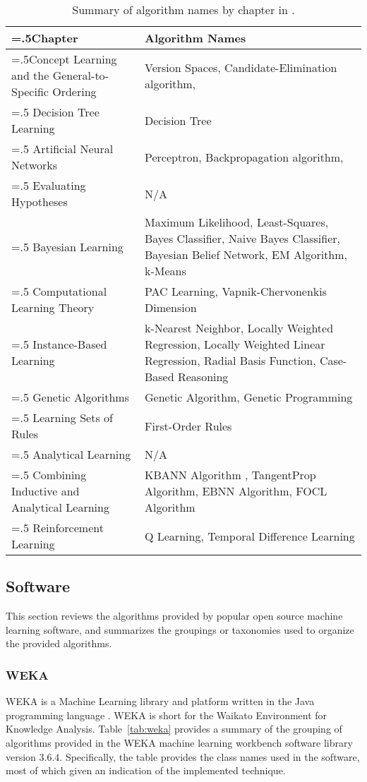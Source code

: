 \documentclass[a4paper, 11pt]{article}
\begin{document}
\begin{table}[ht]
	\centering\footnotesize
		\begin{tabularx}{\textwidth}{>{\hsize=.5\hsize}XX}
		\toprule
		\textbf{Chapter} & \textbf{Algorithm Names} \\ 
		\toprule
		Concept Learning and the General-to-Specific Ordering & Version Spaces, Candidate-Elimination algorithm, \\
		\midrule
		Decision Tree Learning & Decision Tree\\
		\midrule		
		Artificial Neural Networks & Perceptron, Backpropagation algorithm, \\
		\midrule		
		Evaluating Hypotheses & N/A \\
		\midrule		
		Bayesian Learning & Maximum Likelihood, Least-Squares, Bayes Classifier, Naive Bayes Classifier, Bayesian Belief Network, EM Algorithm, k-Means \\
		\midrule				
		Computational Learning Theory & PAC Learning, Vapnik-Chervonenkis Dimension \\
		\midrule		
		Instance-Based Learning & k-Nearest Neighbor, Locally Weighted Regression, Locally Weighted Linear Regression, Radial Basis Function, Case-Based Reasoning \\
		\midrule		
		Genetic Algorithms & Genetic Algorithm, Genetic Programming \\
		\midrule		
		Learning Sets of Rules & First-Order Rules \\
		\midrule		
		Analytical Learning & N/A \\
		\midrule		
		Combining Inductive and Analytical Learning & KBANN Algorithm , TangentProp Algorithm, EBNN Algorithm, FOCL Algorithm\\
		\midrule		
		Reinforcement Learning & Q Learning, Temporal Difference Learning\\
		\bottomrule
		\end{tabularx}	
	\caption{Summary of algorithm names by chapter in .}
	\label{tab:mlbook}
\end{table}


\subsection{Software}
This section reviews the algorithms provided by popular open source machine learning software, and summarizes the groupings or taxonomies used to organize the provided algorithms.

\subsubsection{WEKA}
WEKA is a Machine Learning library and platform written in the Java programming language \cite{Hall2009, Witten2000}. WEKA is short for the Waikato Environment for Knowledge Analysis. Table~\ref{tab:weka} provides a summary of the grouping of algorithms provided in the WEKA machine learning workbench software library version 3.6.4. Specifically, the table provides the class names used in the software, most of which given an indication of the implemented technique.  
\end{document}
